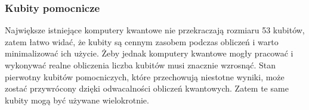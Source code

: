 \subsubsection{Kubity pomocnicze}
Największe istniejące komputery kwantowe nie przekraczają rozmiaru 53 kubitów, zatem łatwo widać, że kubity są cennym zasobem podczas obliczeń i warto minimalizować ich użycie. Żeby jednak komputery kwantowe mogły pracować i wykonywać realne obliczenia liczba kubitów musi znacznie wzrosnąć. Stan pierwotny kubitów pomocniczych, które przechowują niestotne wyniki, może zostać przywrócony dzięki odwacalności obliczeń kwantowych. Zatem te same kubity mogą być używane wielokrotnie.

